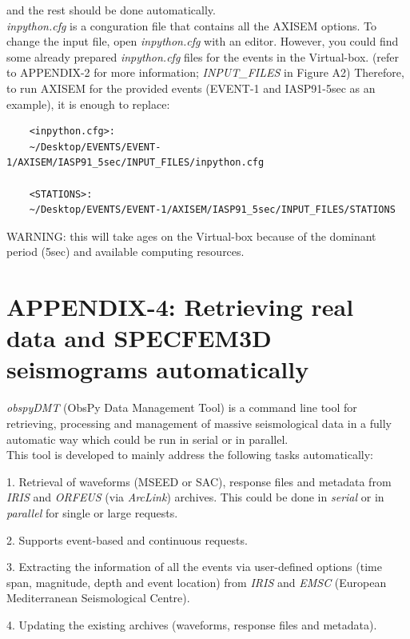 \documentclass{article}
\begin{document}
and the rest should be done automatically. \\
\textit{inpython.cfg} is a conguration file that 
contains all the AXISEM options. To change the input file, open \textit{inpython.cfg} with 
an editor. However, you could find some already prepared \textit{inpython.cfg} files for 
the events in the Virtual-box. (refer to APPENDIX-2 for more information; \textit{INPUT\_FILES} in Figure A2) 
Therefore, to run AXISEM for the provided events (EVENT-1 
and IASP91-5sec as an example), it is enough to replace:

\begin{verbatim}
    <inpython.cfg>: 
    ~/Desktop/EVENTS/EVENT-1/AXISEM/IASP91_5sec/INPUT_FILES/inpython.cfg
    
    <STATIONS>:
    ~/Desktop/EVENTS/EVENT-1/AXISEM/IASP91_5sec/INPUT_FILES/STATIONS
\end{verbatim}

WARNING: this will take ages on the Virtual-box because of the dominant period (5sec) and available computing resources.

\newpage
\section{APPENDIX-4: Retrieving real data and SPECFEM3D seismograms automatically}

{\color{color18} \emph{obspyDMT}} (ObsPy Data Management Tool) is a command line 
tool for retrieving, processing and management of massive seismological data in 
a fully automatic way which could be run in serial or in parallel. \\

This tool is developed to mainly address the following tasks automatically:

1. Retrieval of waveforms (MSEED or SAC), response files and metadata from {\color{color18} \emph{IRIS}} 
and {\color{color18} \emph{ORFEUS}} (via {\color{color18} \emph{ArcLink}}) archives. 
This could be done in \textit{serial} or in \textit{parallel} for single or large 
requests.

2. Supports event-based and continuous requests.

3. Extracting the information of all the events via user-defined options (time 
span, magnitude, depth and event location) from {\color{color18} \emph{IRIS}} and 
{\color{color18} \emph{EMSC}} (European Mediterranean Seismological Centre).

4. Updating the existing archives (waveforms, response files and metadata).
\end{document}

